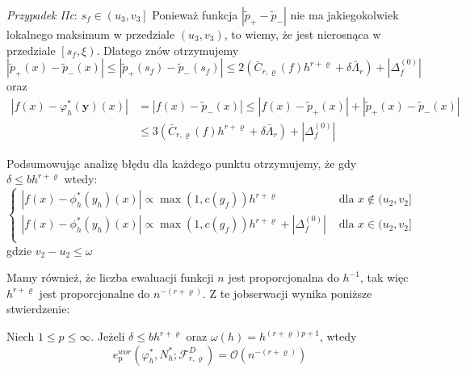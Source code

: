 \documentclass[oik, pdftex, robocza, man]{mgrwms}
\begin{document}
    \textit{Przypadek IIc}: $s_{f} \in\left(u_{3}, v_{3}\right]$
    Ponieważ funkcja $\left|\tilde{p}_{+}-\tilde{p}_{-}\right|$ nie ma jakiegokolwiek lokalnego maksimum w przedziale $\left(u_{3}, v_{3}\right)$, to wiemy, że jest nierosnąca w przedziale $\left[s_{f}, \xi\right)$. Dlatego znów otrzymujemy
    \begin{equation*}
        \left|\tilde{p}_{+}(x)-\tilde{p}_{-}(x)\right| \leq\left|\tilde{p}_{+}\left(s_{f}\right)-\tilde{p}_{-}\left(s_{f}\right)\right| \leq 2\left(\bar{C}_{r, \varrho}(f) h^{r+\varrho}+\delta \bar{\Lambda}_{r}\right)+\left|\Delta_{f}^{(0)}\right|        
    \end{equation*}
    oraz
    \begin{equation*}
        \begin{aligned}
            \left|f(x)-\varphi_{h}^{*}(\mathbf{y})(x)\right| &=\left|f(x)-\tilde{p}_{-}(x)\right| \leq\left|f(x)-\tilde{p}_{+}(x)\right|+\left|\tilde{p}_{+}(x)-\tilde{p}_{-}(x)\right| \\
            & \leq 3\left(\bar{C}_{r, \varrho}(f) h^{r+\varrho}+\delta \bar{\Lambda}_{r}\right)+\left|\Delta_{f}^{(0)}\right|
        \end{aligned}
    \end{equation*}

    Podsumowując analizę błędu dla każdego punktu otrzymujemy, że gdy $\delta \leq bh^{r+\varrho}$ wtedy:
    \begin{equation*}
        \begin{cases}
            |f(x) - \phi_{h}^{*}(y_{h})(x)| \propto \max(1, c(g_{f})) h^{r+\varrho} & \text{ dla } x \notin (u_{2}, v_{2}] \\
            |f(x) - \phi_{h}^{*}(y_{h})(x)| \propto \max(1, c(g_{f})) h^{r+\varrho} + |\Delta_{f}^{(0)}| & \text{ dla } x \in (u_{2}, v_{2}] \\
        \end{cases}
    \end{equation*}
    gdzie $v_{2} - u_{2} \leq \omega$

    Mamy również, że liczba ewaluacji funkcji $n$ jest proporcjonalna do $h^{-1}$, tak więc $h^{r+\varrho}$ jest proporcjonalne do $n^{-(r+\varrho)}$. Z te jobserwacji wynika poniższe stwierdzenie:
    \begin{stw}
        \label{stw2}
        Niech $1 \leq p \leq \infty$. Jeżeli $\delta \leq bh^{r+\varrho}$ oraz $\omega(h) = h^{(r+\varrho)p + 1}$, wtedy
        \begin{equation*}
            e_{\mathrm{p}}^{wor}\left(\varphi_{h}^{*}, N_{h}^{*} ; \mathcal{F}_{r, \varrho}^{D}\right)=\mathcal{O}\left(n^{-(r+\varrho)}\right)
        \end{equation*}
    \end{stw}
\end{document}
